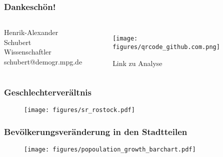 \documentclass[aspectratio=169]{beamer}
\begin{document}
\begin{frame}[mpidrbackground=5]
    \frametitle{Dankesch\"on!}
    
    \vspace{0.8cm}
    
    \begin{columns}
          
           Henrik-Alexander Schubert\\ \vspace{0.3cm}
            Wissenschaftler \\ \vspace{0.15cm}
            schubert@demogr.mpg.de \\

    



                \begin{figure}
                \centering
                \texttt{[image: figures/qrcode\_github.com.png]}
                \caption{Link zu Analyse}
            \end{figure}
             
       \end{columns}

\end{frame}

\appendix

\begin{frame}
\frametitle{Geschlechterver\"altnis}
    \begin{figure}
               \centering
               \vspace{-10pt}
               \texttt{[image: figures/sr\_rostock.pdf]}
           \end{figure}
\end{frame}


\begin{frame}
\frametitle{Bev\"olkerungsver\"anderung in den Stadtteilen}
           \begin{figure}
               \centering
                \vspace{-10pt}
               \texttt{[image: figures/popoulation\_growth\_barchart.pdf]}
           \end{figure}
\end{frame}
\end{document}
